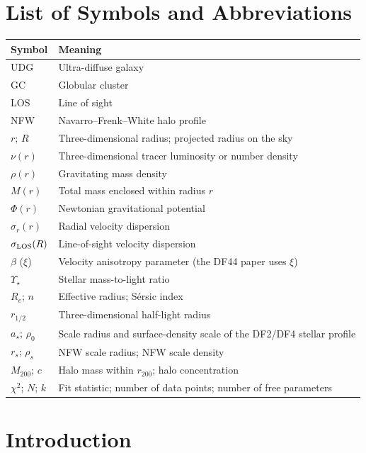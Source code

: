 \documentclass[12pt,a4paper]{report}
\numberwithin{equation}{chapter}
\begin{document}
\chapter*{List of Symbols and Abbreviations}
\begin{tabular}{@{}p{3.0cm}p{10.0cm}@{}}
\toprule
\textbf{Symbol} & \textbf{Meaning} \\
\midrule
UDG & Ultra-diffuse galaxy \\
GC & Globular cluster \\
LOS & Line of sight \\
NFW & Navarro--Frenk--White halo profile \\
$r$; $R$ & Three-dimensional radius; projected radius on the sky \\
$\nu(r)$ & Three-dimensional tracer luminosity or number density \\
$\rho(r)$ & Gravitating mass density \\
$M(r)$ & Total mass enclosed within radius $r$ \\
$\Phi(r)$ & Newtonian gravitational potential \\
$\sigma_r(r)$ & Radial velocity dispersion \\
$\sigma_{\rm LOS}(R)$ & Line-of-sight velocity dispersion \\
$\beta$ ($\xi$) & Velocity anisotropy parameter (the DF44 paper uses $\xi$) \\
$\Upsilon_\star$ & Stellar mass-to-light ratio \\
$R_e$; $n$ & Effective radius; S\'ersic index \\
$r_{1/2}$ & Three-dimensional half-light radius \\
$a_\star$; $\rho_0$ & Scale radius and surface-density scale of the DF2/DF4 stellar profile \\
$r_s$; $\rho_s$ & NFW scale radius; NFW scale density \\
$M_{200}$; $c$ & Halo mass within $r_{200}$; halo concentration \\
$\chi^2$; $N$; $k$ & Fit statistic; number of data points; number of free parameters \\
\bottomrule
\end{tabular}

\clearpage
{}
\setcounter{page}{1}

\chapter{Introduction}
\end{document}
